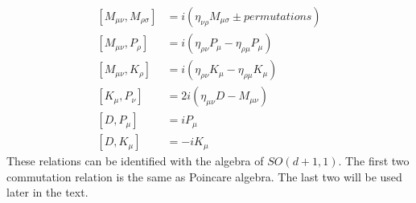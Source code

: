 \documentclass[12pt,a4paper,oneside]{book}
\theoremstyle{definition}
\begin{document}
    \begin{subequations}
    \begin{align}\label{liealgebra}
        \left[M_{\mu\nu},M_{\rho\sigma} \right] &= i\left(\eta_{\nu\rho}M_{\mu\sigma} \pm permutations  \right)\\
        \left[M_{\mu\nu},P_{\rho} \right] &= i \left(\eta_{\rho\nu}P_{\mu} - \eta_{\rho\mu}P_{\mu} \right)\\
        \left[M_{\mu\nu},K_{\rho} \right] &= i \left(\eta_{\rho\nu}K_{\mu} - \eta_{\rho\mu}K_{\mu} \right)\\
        \left[K_{\mu},P_{\nu} \right] &= 2i \left(\eta_{\mu\nu}D - M_{\mu\nu} \right)\\
        \left[D,P_{\mu} \right] &= i P_{\mu}\\
        \left[D,K_{\mu}\right] &= -i K_{\mu}
    \end{align}
\end{subequations}
    These relations can be identified with the algebra of $SO(d+1,1)$\cite{lecturenote}\cite{textbook}.  
    The first two commutation relation is the same as Poincare algebra. The last two will be used later in the text.
\end{document}
